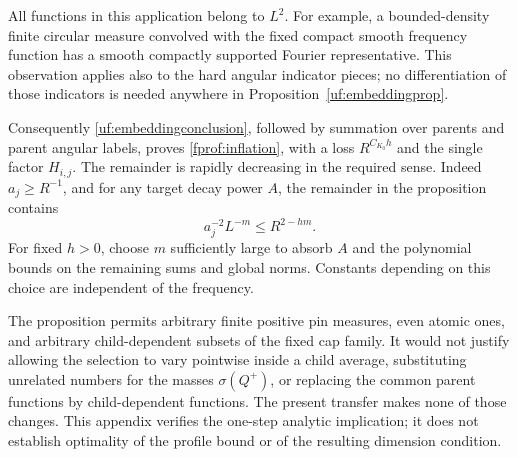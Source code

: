 All functions in this application belong to \(L^2\). For example,
a bounded-density finite circular measure convolved with the fixed
compact smooth frequency function has a smooth compactly supported
Fourier representative. This observation applies also to the hard
angular indicator pieces; no differentiation of those indicators is
needed anywhere in Proposition~\ref{uf:embeddingprop}.

Consequently \eqref{uf:embeddingconclusion}, followed by summation
over parents and parent angular labels, proves
\eqref{fprof:inflation}, with a loss \(R^{C_{K_0}h}\) and the single
factor \(H_{i,j}\). The remainder is rapidly decreasing in the
required sense. Indeed \(a_j\geq R^{-1}\), and for any target
decay power \(A\), the remainder in the proposition contains
$$
 a_j^{-2}L^{-m}\leq R^{2-hm}.
$$
For fixed \(h>0\), choose \(m\) sufficiently large to absorb \(A\)
and the polynomial bounds on the remaining sums and global norms.
Constants depending on this choice are independent of the frequency.

\begin{remark}
The proposition permits arbitrary finite positive pin measures, even
atomic ones, and arbitrary child-dependent subsets of the fixed cap
family. It would not justify allowing the selection to vary pointwise
inside a child average, substituting unrelated numbers for the masses
\(\sigma(Q^+)\), or replacing the common parent functions by
child-dependent functions. The present transfer makes none of those
changes. This appendix verifies the one-step analytic implication; it
does not establish optimality of the profile bound or of the resulting
dimension condition.
\end{remark}
